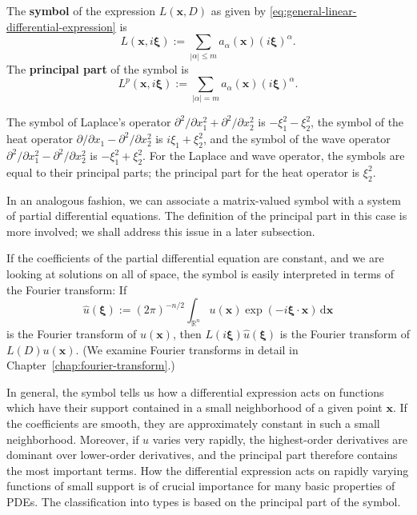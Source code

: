 \begin{Definition}
\label{def:differential-symbol}
The \textbf{symbol} of the expression $L(\bm{x},D)$ as given by \eqref{eq:general-linear-differential-expression} is
\begin{equation}\label{eq:differential-symbol}
L(\bm{x},i\bm{\xi}):=\sum_{|\alpha|\leq m}a_{\alpha}(\bm{x})(i\bm{\xi})^{\alpha}.
\end{equation}
The \textbf{principal part} of the symbol is
\begin{equation}\label{eq:principal-symbol}
L^p(\bm{x},i\bm{\xi}):=\sum_{|\alpha|=m}a_{\alpha}(\bm{x})(i\bm{\xi})^{\alpha}.
\end{equation}

\end{Definition}

\begin{Example}
\label{ex:classical-differential-symbols}
The symbol of Laplace's operator $\partial^2/\partial x_1^2+\partial^2/\partial x_2^2$ is $-\xi_1^2-\xi_2^2$, the symbol of the heat operator $\partial/\partial x_1-\partial^2/\partial x_2^2$ is $i\xi_1+\xi_2^2$, and the symbol of the wave operator $\partial^2/\partial x_1^2-\partial^2/\partial x_2^2$ is $-\xi_1^2+\xi_2^2$. For the Laplace and wave operator, the symbols are equal to their principal parts; the principal part for the heat operator is $\xi_2^2$.
\end{Example}

In an analogous fashion, we can associate a matrix-valued symbol with a system of partial differential equations. The definition of the principal part in this case is more involved; we shall address this issue in a later subsection.

If the coefficients of the partial differential equation are constant, and we are looking at solutions on all of space, the symbol is easily interpreted in terms of the Fourier transform: If
\begin{equation}\label{eq:classification-fourier-transform}
\hat u(\bm{\xi}):=(2\pi)^{-n/2}\int_{\mathbb{R}^n}u(\bm{x})\exp(-i\bm{\xi}\cdot\bm{x})\,\mathrm{d}\bm{x}
\end{equation}
is the Fourier transform of $u(\bm{x})$, then $L(i\bm{\xi})\hat u(\bm{\xi})$ is the Fourier transform of $L(D)u(\bm{x})$. (We examine Fourier transforms in detail in Chapter~\ref{chap:fourier-transform}.)

In general, the symbol tells us how a differential expression acts on functions which have their support contained in a small neighborhood of a given point $\bm{x}$. If the coefficients are smooth, they are approximately constant in such a small neighborhood. Moreover, if $u$ varies very rapidly, the highest-order derivatives are dominant over lower-order derivatives, and the principal part therefore contains the most important terms. How the differential expression acts on rapidly varying functions of small support is of crucial importance for many basic properties of PDEs. The classification into types is based on the principal part of the symbol.

